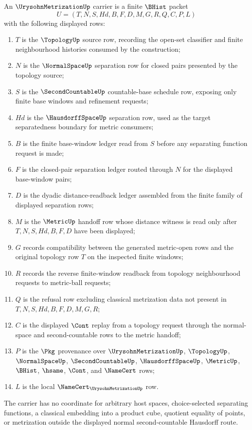 \begin{definition}
\label{def:urysohn-metrization-carrier}
An $\UrysohnMetrizationUp$ carrier is a finite $\BHist$ packet
$$
U=(T,N,S,Hd,B,F,D,M,G,R,Q,C,P,L)
$$
with the following displayed rows:
\begin{enumerate}
\item $T$ is the $\TopologyUp$ source row, recording the open-set classifier and finite neighbourhood histories consumed by the construction;
\item $N$ is the $\NormalSpaceUp$ separation row for closed pairs presented by the topology source;
\item $S$ is the $\SecondCountableUp$ countable-base schedule row, exposing only finite base windows and refinement requests;
\item $Hd$ is the $\HausdorffSpaceUp$ separation row, used as the target separatedness boundary for metric consumers;
\item $B$ is the finite base-window ledger read from $S$ before any separating function request is made;
\item $F$ is the closed-pair separation ledger routed through $N$ for the displayed base-window pairs;
\item $D$ is the dyadic distance-readback ledger assembled from the finite family of displayed separation rows;
\item $M$ is the $\MetricUp$ handoff row whose distance witness is read only after $T,N,S,Hd,B,F,D$ have been displayed;
\item $G$ records compatibility between the generated metric-open rows and the original topology row $T$ on the inspected finite windows;
\item $R$ records the reverse finite-window readback from topology neighbourhood requests to metric-ball requests;
\item $Q$ is the refusal row excluding classical metrization data not present in $T,N,S,Hd,B,F,D,M,G,R$;
\item $C$ is the displayed $\Cont$ replay from a topology request through the normal-space and second-countable rows to the metric handoff;
\item $P$ is the $\Pkg$ provenance over $\UrysohnMetrizationUp$, $\TopologyUp$, $\NormalSpaceUp$, $\SecondCountableUp$, $\HausdorffSpaceUp$, $\MetricUp$, $\BHist$, $\hsame$, $\Cont$, and $\NameCert$ rows;
\item $L$ is the local $\NameCert_{\UrysohnMetrizationUp}$ row.
\end{enumerate}
The carrier has no coordinate for arbitrary host spaces, choice-selected separating functions, a classical embedding into a product cube, quotient equality of points, or metrization outside the displayed normal second-countable Hausdorff route.
\end{definition}

